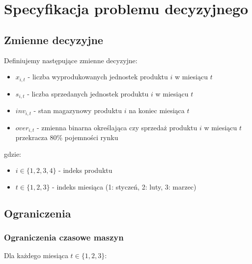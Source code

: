 \section{Specyfikacja problemu decyzyjnego}

\subsection{Zmienne decyzyjne}

Definiujemy następujące zmienne decyzyjne:
\begin{itemize}
  \item $x_{i,t}$ - liczba wyprodukowanych jednostek produktu $i$ w miesiącu $t$
  \item $s_{i,t}$ - liczba sprzedanych jednostek produktu $i$ w miesiącu $t$
  \item $inv_{i,t}$ - stan magazynowy produktu $i$ na koniec miesiąca $t$
  \item $over_{i,t}$ - zmienna binarna określająca czy sprzedaż produktu $i$ w miesiącu $t$ przekracza 80\% pojemności rynku
\end{itemize}

gdzie:
\begin{itemize}
  \item $i \in \{1,2,3,4\}$ - indeks produktu
  \item $t \in \{1,2,3\}$ - indeks miesiąca (1: styczeń, 2: luty, 3: marzec)
\end{itemize}

\subsection{Ograniczenia}

\subsubsection{Ograniczenia czasowe maszyn}

Dla każdego miesiąca $t \in \{1,2,3\}$:

